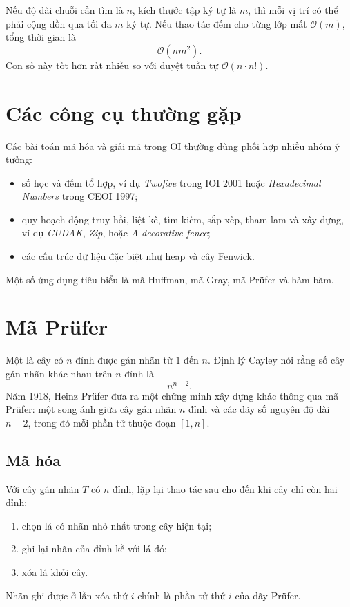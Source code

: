 \documentclass[11pt]{article}
\newcommand{\Oh}{\mathcal{O}}
\begin{document}
Nếu độ dài chuỗi cần tìm là \(n\), kích thước tập ký tự là \(m\), thì mỗi vị
trí có thể phải cộng dồn qua tối đa \(m\) ký tự. Nếu thao tác đếm cho từng
lớp mất \(\Oh(m)\), tổng thời gian là
\[
  \Oh(nm^2).
\]
Con số này tốt hơn rất nhiều so với duyệt tuần tự \(\Oh(n\cdot n!)\).

\section{Các công cụ thường gặp}

Các bài toán mã hóa và giải mã trong OI thường dùng phối hợp nhiều nhóm ý
tưởng:
\begin{itemize}
  \item số học và đếm tổ hợp, ví dụ \emph{Twofive} trong IOI 2001 hoặc
  \emph{Hexadecimal Numbers} trong CEOI 1997;
  \item quy hoạch động truy hồi, liệt kê, tìm kiếm, sắp xếp, tham lam và xây
  dựng, ví dụ \emph{CUDAK}, \emph{Zip}, hoặc \emph{A decorative fence};
  \item các cấu trúc dữ liệu đặc biệt như heap và cây Fenwick.
\end{itemize}

Một số ứng dụng tiêu biểu là mã Huffman, mã Gray, mã Prüfer và hàm băm.

\section{\texorpdfstring{Mã Prüfer}{Mã Prüfer}}

Một  là cây có \(n\) đỉnh được gán nhãn từ \(1\) đến
\(n\). Định lý Cayley nói rằng số cây gán nhãn khác nhau trên \(n\) đỉnh là
\[
  n^{n-2}.
\]
Năm 1918, Heinz Prüfer đưa ra một chứng minh xây dựng khác thông qua mã
Prüfer: một song ánh giữa cây gán nhãn \(n\) đỉnh và các dãy số nguyên độ dài
\(n-2\), trong đó mỗi phần tử thuộc đoạn \([1,n]\).

\subsection{Mã hóa}

Với cây gán nhãn \(T\) có \(n\) đỉnh, lặp lại thao tác sau cho đến khi cây
chỉ còn hai đỉnh:
\begin{enumerate}
  \item chọn lá có nhãn nhỏ nhất trong cây hiện tại;
  \item ghi lại nhãn của đỉnh kề với lá đó;
  \item xóa lá khỏi cây.
\end{enumerate}
Nhãn ghi được ở lần xóa thứ \(i\) chính là phần tử thứ \(i\) của dãy Prüfer.
\end{document}
